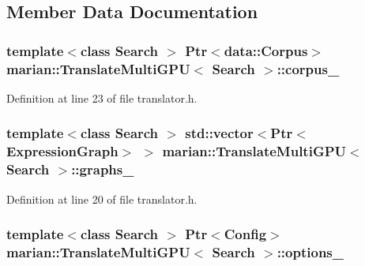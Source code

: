 \subsection{Member Data Documentation}
\subsubsection[{\texorpdfstring{corpus\+\_\+}{corpus_}}]{\setlength{\rightskip}{0pt plus 5cm}template$<$class Search $>$ {\bf Ptr}$<${\bf data\+::\+Corpus}$>$ {\bf marian\+::\+Translate\+Multi\+G\+PU}$<$ Search $>$\+::corpus\+\_\+\hspace{0.3cm}{\ttfamily [private]}}\hypertarget{classmarian_1_1TranslateMultiGPU_a7fce5f63667fe7a8dbdf94d1146aa2f8}{}\label{classmarian_1_1TranslateMultiGPU_a7fce5f63667fe7a8dbdf94d1146aa2f8}


Definition at line 23 of file translator.\+h.

\subsubsection[{\texorpdfstring{graphs\+\_\+}{graphs_}}]{\setlength{\rightskip}{0pt plus 5cm}template$<$class Search $>$ std\+::vector$<${\bf Ptr}$<${\bf Expression\+Graph}$>$ $>$ {\bf marian\+::\+Translate\+Multi\+G\+PU}$<$ Search $>$\+::graphs\+\_\+\hspace{0.3cm}{\ttfamily [private]}}\hypertarget{classmarian_1_1TranslateMultiGPU_ab4ffb4c6d4e65d3cc564f0b290f0bc72}{}\label{classmarian_1_1TranslateMultiGPU_ab4ffb4c6d4e65d3cc564f0b290f0bc72}


Definition at line 20 of file translator.\+h.

\subsubsection[{\texorpdfstring{options\+\_\+}{options_}}]{\setlength{\rightskip}{0pt plus 5cm}template$<$class Search $>$ {\bf Ptr}$<${\bf Config}$>$ {\bf marian\+::\+Translate\+Multi\+G\+PU}$<$ Search $>$\+::options\+\_\+\hspace{0.3cm}{\ttfamily [private]}}\hypertarget{classmarian_1_1TranslateMultiGPU_aee684bc13d5c8a9f84c1a1a18a73a147}{}\label{classmarian_1_1TranslateMultiGPU_aee684bc13d5c8a9f84c1a1a18a73a147}


